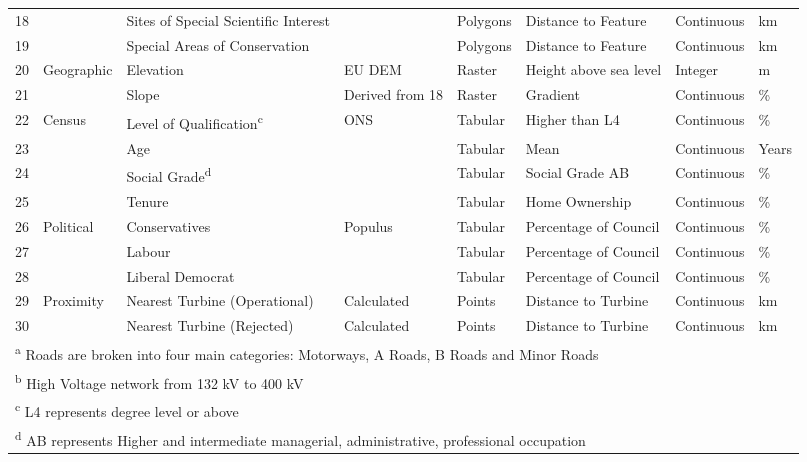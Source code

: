 \documentclass[a4paper,]{article}
\theoremstyle{definition}
\theoremstyle{definition}
\theoremstyle{definition}
\theoremstyle{remark}
\begin{document}
\begin{landscape}
\begin{table}[t]
{\begin{tabular}{rlllllll}
18 &  & Sites of Special Scientific Interest &  & Polygons & Distance to Feature & Continuous & km\\
19 &  & Special Areas of Conservation &  & Polygons & Distance to Feature & Continuous & km\\
20 & Geographic & Elevation & EU DEM & Raster & Height above sea level & Integer & m\\
21 &  & Slope & Derived from 18 & Raster & Gradient & Continuous & \%\\
22 & Census & Level of Qualification\textsuperscript{c} & ONS & Tabular & Higher than L4 & Continuous & \%\\
23 &  & Age &  & Tabular & Mean & Continuous & Years\\
24 &  & Social Grade\textsuperscript{d} &  & Tabular & Social Grade AB & Continuous & \%\\
25 &  & Tenure &  & Tabular & Home Ownership & Continuous & \%\\
26 & Political & Conservatives & Populus & Tabular & Percentage of Council & Continuous & \%\\
27 &  & Labour &  & Tabular & Percentage of Council & Continuous & \%\\
28 &  & Liberal Democrat &  & Tabular & Percentage of Council & Continuous & \%\\
29 & Proximity & Nearest Turbine (Operational) & Calculated & Points & Distance to Turbine & Continuous & km\\
30 &  & Nearest Turbine (Rejected) & Calculated & Points & Distance to Turbine & Continuous & km\\
\bottomrule
\multicolumn{8}{l}{\textsuperscript{a} Roads are broken into four main categories: Motorways, A Roads, B Roads and Minor Roads}\\
\multicolumn{8}{l}{\textsuperscript{b} High Voltage network from 132 kV to 400 kV}\\
\multicolumn{8}{l}{\textsuperscript{c} L4 represents degree level or above}\\
\multicolumn{8}{l}{\textsuperscript{d} AB represents Higher and intermediate managerial, administrative, professional occupation}\\
\end{tabular}}
\end{table}
\end{landscape}
\end{document}
